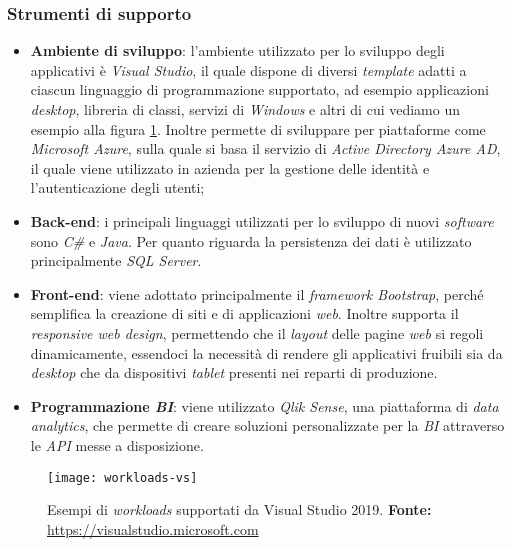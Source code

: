 \subsubsection{Strumenti di supporto}
\begin{itemize}
	\item \textbf{Ambiente di sviluppo}: l'ambiente utilizzato per lo sviluppo degli applicativi è \textit{Visual Studio}, il quale dispone di diversi \textit{template} adatti a ciascun linguaggio di programmazione supportato, ad esempio applicazioni \textit{desktop}, libreria di classi, servizi di \textit{Windows} e altri di cui vediamo un esempio alla figura \ref{fig:workload-vs}. Inoltre permette di sviluppare per piattaforme come \textit{Microsoft Azure}, sulla quale si basa il servizio di \textit{Active Directory Azure AD}, il quale viene utilizzato in azienda per la gestione delle identità e l'autenticazione degli utenti;
	\item \textbf{Back-end}: i principali linguaggi utilizzati per lo sviluppo di nuovi \textit{software} sono \textit{C\#} e \textit{Java}. 
	Per quanto riguarda la persistenza dei dati è utilizzato principalmente \textit{SQL Server}.
	\item \textbf{Front-end}: viene adottato principalmente il \textit{framework Bootstrap}, perché semplifica la creazione di siti e di applicazioni \textit{web}. Inoltre supporta il \textit{responsive web design}, permettendo che il \textit{layout} delle pagine \textit{web} si regoli dinamicamente, essendoci la necessità di rendere gli applicativi fruibili sia da \textit{desktop} che da dispositivi \textit{tablet} presenti nei reparti di produzione.
	\item \textbf{Programmazione \textit{BI}}: viene utilizzato \textit{Qlik Sense}, una piattaforma di \textit{data analytics}, che permette di creare soluzioni personalizzate per la \textit{BI} attraverso le \textit{API} messe a disposizione.
\end{itemize}



\begin{figure}[htbp]
	\begin{center}
		\texttt{[image: workloads-vs]}
		\caption{Esempi di \textit{workloads} supportati da Visual Studio 2019. \newline
		\textbf{Fonte: } \url{https://visualstudio.microsoft.com}}
	\label{fig:workload-vs}
	\end{center}
\end{figure}


